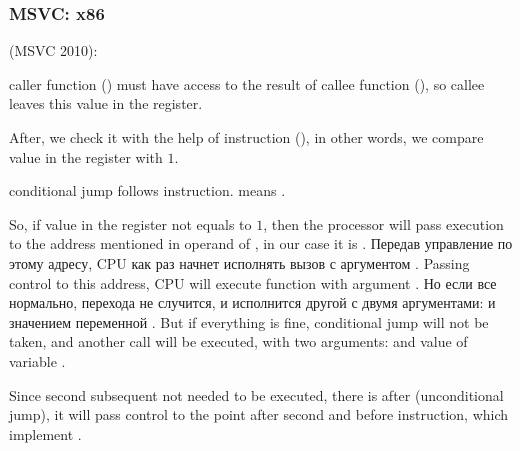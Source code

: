 ﻿\subsubsection{MSVC: x86}

 (MSVC 2010):



{\Gls{caller} function (\main) must have access to the result of \gls{callee} function (\scanf), 
so \gls{callee} leaves this value in the \EAX register.}

{After, we check it with the help of instruction  (),
in other words, we compare value in the \EAX register with $1$.} 

{\JNE conditional jump follows \CMP instruction. \JNE means .}

{So, if value in the \EAX register not equals to $1$, then the processor will pass execution to the 
address mentioned in operand of \JNE, in our case it is .}
\IFRU
{Передав управление по этому адресу, \ac{CPU} как раз начнет исполнять вызов \printf с 
аргументом .}
{Passing control to this address, \ac{CPU} will execute function \printf 
with argument .}
\IFRU
{Но если все нормально, перехода не случится, и исполнится другой \printf с двумя аргументами: 
 и значением переменной .}
{But if everything is fine, conditional jump will not be taken, and another \printf call 
will be executed, with two arguments:  and value of variable . }

{Since second subsequent \printf not needed to be executed, there is \JMP after (unconditional jump),
it will pass control to the point after second \printf and before  instruction, 
which implement .}

